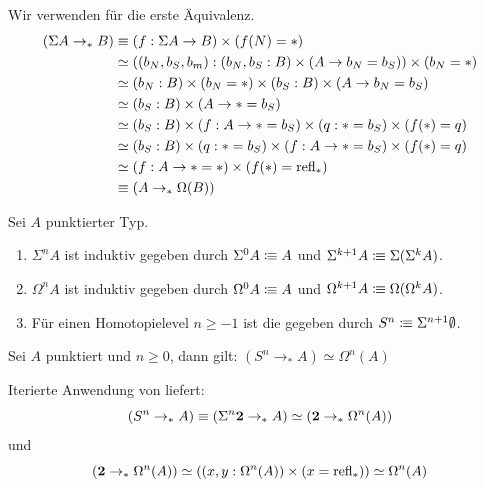 \begin{beweis}
  Wir verwenden  für die erste Äquivalenz.
  \begin{align*}
    (\Sigma A\to_\ast B)&\equiv (f:\Sigma A\to B)\times (f(N)=\ast) \\
    &\simeq ((b_N,b_S,b_m):(b_N,b_S:B)\times (A\to b_N=b_S))\times (b_N=\ast) \\
    &\simeq (b_N:B)\times (b_N=\ast)\times (b_S:B)\times (A\to b_N=b_S) \\
    &\simeq (b_S:B)\times (A\to \ast=b_S) \\
    &\simeq (b_S:B)\times (f:A\to \ast=b_S) \times (q:\ast=b_S) \times (f(\ast)=q) \\
    &\simeq (b_S:B)\times (q:\ast=b_S) \times (f:A\to \ast=b_S) \times (f(\ast)=q) \\
    &\simeq (f:A\to \ast=\ast) \times (f(\ast)=\mathrm{refl}_\ast) \\
    &\equiv (A\to_\ast \Omega(B))
  \end{align*}
\end{beweis}

\begin{definition}
  Sei $A$ punktierter Typ.
  \begin{enumerate}
  \item $\Sigma^n A$ ist induktiv gegeben durch $\Sigma^0 A\vcentcolon\mspace{-1.2mu}\equiv A$ und $\Sigma^{k+1}A\vcentcolon\mspace{-1.2mu}\equiv \Sigma(\Sigma^k A)$.
  \item $\Omega^n A$ ist induktiv gegeben durch $\Omega^0 A\vcentcolon\mspace{-1.2mu}\equiv A$ und $\Omega^{k+1}A\vcentcolon\mspace{-1.2mu}\equiv \Omega(\Omega^k A)$.
  \item Für einen Homotopielevel $n\geq -1$ ist die  gegeben durch $S^n\vcentcolon\mspace{-1.2mu}\equiv\Sigma^{n+1}\emptyset$.
  \end{enumerate}
\end{definition}

\begin{bemerkung}
  Sei $A$ punktiert und $n\geq 0$, dann gilt:
  $(S^n\to_\ast A)\simeq \Omega^n(A)$
\end{bemerkung}

\begin{beweis}
  Iterierte Anwendung von  liefert:
  \[
  (S^n\to_\ast A)\equiv (\Sigma^n\mathbf{2}\to_\ast A) \simeq (\mathbf{2}\to_\ast\Omega^n(A))
  \]
  und
  \[
  (\mathbf{2}\to_\ast\Omega^n(A))\simeq ((x,y:\Omega^n(A))\times (x=\mathrm{refl}_\ast))\simeq \Omega^n(A)
  \]
\end{beweis}

